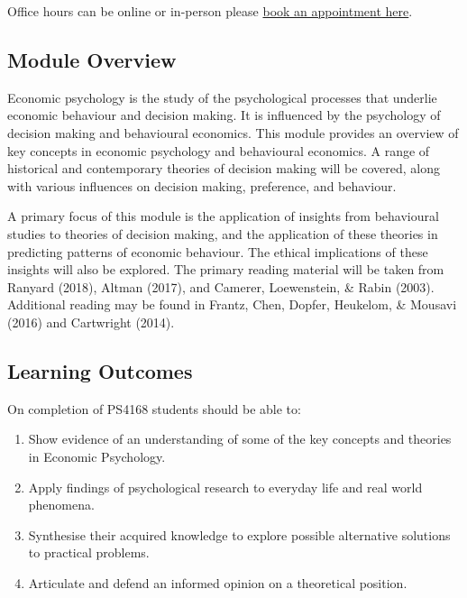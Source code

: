 \documentclass[
  x11names]{article}
\begin{document}
\bigskip

Office hours can be online or in-person please
\color{blue}\href{https://outlook.office.com/bookwithme/user/f570b7289a5343259c60c8a5d26ce510@ul.ie/meetingtype/w1pxpwCL8UG9pt_0cg2fUA2?anonymous&ep=mlink}{book
an appointment here}\color{black}.

\subsection{Module Overview}\label{module-overview}

Economic psychology is the study of the psychological processes that
underlie economic behaviour and decision making. It is influenced by the
psychology of decision making and behavioural economics. This module
provides an overview of key concepts in economic psychology and
behavioural economics. A range of historical and contemporary theories
of decision making will be covered, along with various influences on
decision making, preference, and behaviour.

A primary focus of this module is the application of insights from
behavioural studies to theories of decision making, and the application
of these theories in predicting patterns of economic behaviour. The
ethical implications of these insights will also be explored. The
primary reading material will be taken from Ranyard (2018), Altman
(2017), and Camerer, Loewenstein, \& Rabin (2003). Additional reading
may be found in Frantz, Chen, Dopfer, Heukelom, \& Mousavi (2016) and
Cartwright (2014).

\subsection{Learning Outcomes}\label{learning-outcomes}

On completion of PS4168 students should be able to:

\begin{enumerate}
\def\labelenumi{\arabic{enumi}.}
\item
  Show evidence of an understanding of some of the key concepts and
  theories in Economic Psychology.
\item
  Apply findings of psychological research to everyday life and real
  world phenomena.
\item
  Synthesise their acquired knowledge to explore possible alternative
  solutions to practical problems.
\item
  Articulate and defend an informed opinion on a theoretical position.
\end{enumerate}
\end{document}
